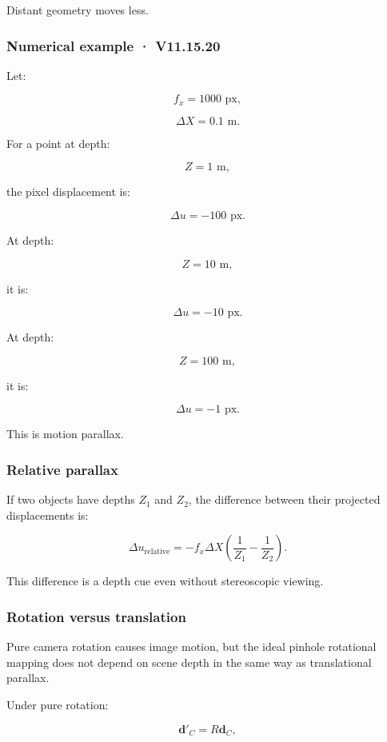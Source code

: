 Distant geometry moves less.

\subsubsection{Numerical example · V11.15.20}\label{numerical-example-v11.15.20}

Let:

\[ f_x=1000\text{ px}, \]

\[ \Delta X=0.1\text{ m}. \]

For a point at depth:

\[ Z=1\text{ m}, \]

the pixel displacement is:

\[ \boxed{\Delta u=-100\text{ px}}. \]

At depth:

\[ Z=10\text{ m}, \]

it is:

\[ \boxed{\Delta u=-10\text{ px}}. \]

At depth:

\[ Z=100\text{ m}, \]

it is:

\[ \boxed{\Delta u=-1\text{ px}}. \]

This is motion parallax.

\subsubsection{Relative parallax}\label{relative-parallax}

If two objects have depths \(Z_1\) and \(Z_2\), the difference between their projected displacements is:

\[ \boxed{ \Delta u_{\mathrm{relative}} = -f_x\Delta X \left( \frac1{Z_1}-\frac1{Z_2} \right). } \]

This difference is a depth cue even without stereoscopic viewing.

\subsubsection{Rotation versus translation}\label{rotation-versus-translation}

Pure camera rotation causes image motion, but the ideal pinhole rotational mapping does not depend on scene depth in the same way as translational parallax.

Under pure rotation:

\[ \mathbf d'_C=R\mathbf d_C, \]

